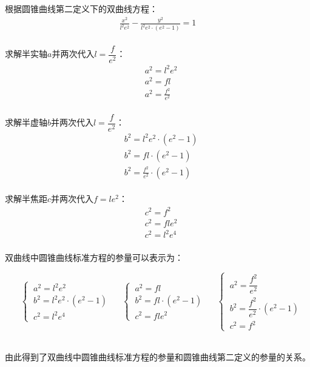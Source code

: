 \documentclass[UTF8]{ctexart}
\begin{document}
    根据圆锥曲线第二定义下的双曲线方程：
    \begin{align}
        \frac{x^2}{l^2e^2}-\frac{y^2}{l^2e^2\cdot\left(e^2-1\right)}=1
    \end{align}\\
    求解半实轴$a$并两次代入$l=\dfrac{f}{e^2}$：
    \begin{align}
        &a^2=l^2e^2\\[4mm]
        &a^2=fl\\[4mm]
        &a^2=\frac{f^2}{e^2}
    \end{align}\\
    求解半虚轴$b$并两次代入$l=\dfrac{f}{e^2}$：
    \begin{align}
        &b^2=l^2e^2\cdot(e^2-1)\\[4mm]
        &b^2=fl\cdot(e^2-1)\\[4mm]
        &b^2=\frac{f^2}{e^2}\cdot\left(e^2-1\right)
    \end{align}\\
    求解半焦距$c$并两次代入$f=le^2$：
    \begin{align}
        &c^2=f^2\\[4mm]
        &c^2=fle^2\\[4mm]
        &c^2=l^2e^4
    \end{align}\\
    双曲线中圆锥曲线标准方程的参量可以表示为：\vspace{5pt}
    \begin{large}
        \begin{equation*}
            ~~~~
            \begin{cases}
                ~a^2=l^2e^2\\[5mm]
                ~b^2=l^2e^2\cdot\left(e^2-1\right)\\[5mm]
                ~c^2=l^2e^4
            \end{cases}~~~~~~
            \begin{cases}
                ~a^2=fl\\[5mm]
                ~b^2=fl\cdot\left(e^2-1\right)\\[5mm]
                ~c^2=fle^2
            \end{cases}~~~~~~
            \begin{cases}
                ~a^2=\dfrac{f^2}{e^2}\\[5mm]
                ~b^2=\dfrac{f^2}{e^2}\cdot\left(e^2-1\right)\\[5mm]
                ~c^2=f^2
            \end{cases}
        \end{equation*}
    \end{large}\\
    由此得到了双曲线中圆锥曲线标准方程的参量和圆锥曲线第二定义的参量的关系。
\end{document}
